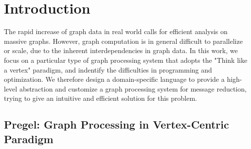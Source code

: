 \documentclass{sokendai_thesis} %
\begin{document}

\mainmatter

\chapter{Introduction}

The rapid increase of graph data in real world calls for efficient analysis on massive graphs.
However, graph computation is in general difficult to parallelize or scale, due to the inherent interdependencies in graph data.
In this work, we focus on a particular type of graph processing system that adopts the "Think like a vertex" paradigm, and indentify the difficulties in programming and optimization.
We therefore design a domain-specific language to provide a high-level abstraction and customize a graph processing system for message reduction, trying to give an intuitive and efficient solution for this problem.

\section{Pregel: Graph Processing in Vertex-Centric Paradigm}
\end{document}
